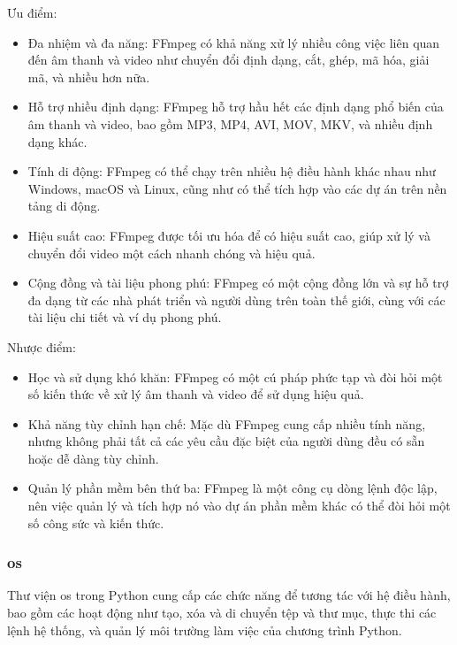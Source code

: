 \documentclass{article} %
\begin{document}
Ưu điểm:
\begin{itemize}
    \item Đa nhiệm và đa năng: FFmpeg có khả năng xử lý nhiều công việc liên quan đến âm thanh và video như chuyển đổi định dạng, cắt, ghép, mã hóa, giải mã, và nhiều hơn nữa.
    \item Hỗ trợ nhiều định dạng: FFmpeg hỗ trợ hầu hết các định dạng phổ biến của âm thanh và video, bao gồm MP3, MP4, AVI, MOV, MKV, và nhiều định dạng khác.
    \item Tính di động: FFmpeg có thể chạy trên nhiều hệ điều hành khác nhau như Windows, macOS và Linux, cũng như có thể tích hợp vào các dự án trên nền tảng di động.
    \item Hiệu suất cao: FFmpeg được tối ưu hóa để có hiệu suất cao, giúp xử lý và chuyển đổi video một cách nhanh chóng và hiệu quả.
    \item Cộng đồng và tài liệu phong phú: FFmpeg có một cộng đồng lớn và sự hỗ trợ đa dạng từ các nhà phát triển và người dùng trên toàn thế giới, cùng với các tài liệu chi tiết và ví dụ phong phú.
\end{itemize}
\hspace{0.0em} Nhược điểm:
\begin{itemize}
    \item Học và sử dụng khó khăn: FFmpeg có một cú pháp phức tạp và đòi hỏi một số kiến thức về xử lý âm thanh và video để sử dụng hiệu quả.
    \item Khả năng tùy chỉnh hạn chế: Mặc dù FFmpeg cung cấp nhiều tính năng, nhưng không phải tất cả các yêu cầu đặc biệt của người dùng đều có sẵn hoặc dễ dàng tùy chỉnh.
    \item Quản lý phần mềm bên thứ ba: FFmpeg là một công cụ dòng lệnh độc lập, nên việc quản lý và tích hợp nó vào dự án phần mềm khác có thể đòi hỏi một số công sức và kiến thức.
\end{itemize}
\subsubsection{os}
Thư viện os trong Python cung cấp các chức năng để tương tác với hệ điều hành, bao gồm các hoạt động như tạo, xóa và di chuyển tệp và thư mục, thực thi các lệnh hệ thống, và quản lý môi trường làm việc của chương trình Python.
\end{document}
